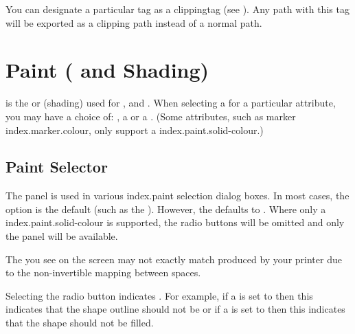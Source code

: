 You can designate a particular tag as a \gls{clippingtag} (see
). Any \gls{path} with this tag will be
exported as a clipping path instead of a normal path.

\chapter{Paint ( and Shading)}
\label{sec:paintcolourandshading}

 is the  or
 (shading) used for
,  and . When selecting a
 for a particular attribute, you may have a choice of:
, a  or a .
(Some attributes, such as marker \gls{index.marker.colour},
only support a \gls{index.paint.solid-colour}.)

\section{Paint Selector}\label{sec:paint}


The  panel is used in various \gls{index.paint}
selection dialog boxes.
In most cases, the  option is the default
(such as the ).  However, the
 defaults to .
Where only a \gls{index.paint.solid-colour} is supported, the radio
buttons will be omitted and only the  panel
will be available.

\begin{warning}
The  you see on the screen may not exactly match
 produced by your printer due to the non-invertible
mapping between  spaces.
\end{warning}


Selecting the  radio button indicates
. For example, if a  is set to
 then this indicates that the \gls{shape}
outline should not be  or if a
 is set to  then
this indicates that the \gls{shape} should not be filled.

